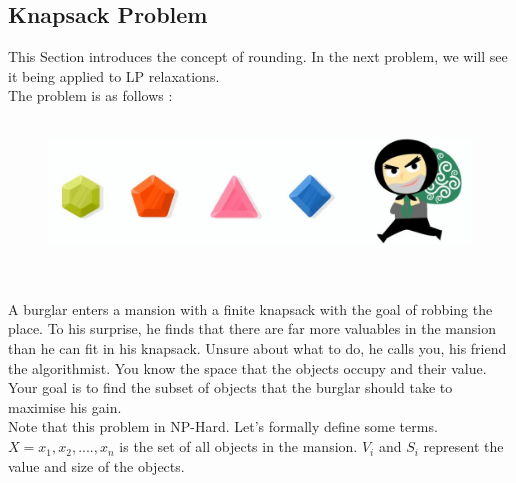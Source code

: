 \documentclass[12pt]{report}
\begin{document}
\subsection*{Knapsack Problem}
This Section introduces the concept of rounding. In the next problem, we will see it being applied to LP relaxations. \\
The problem is as follows :
\begin{figure}[h]
\includegraphics[width=12cm, height=3.75cm]{knap.jpg}
\centering
\end{figure}\\
A burglar enters a mansion with a finite knapsack with the goal of robbing the place. To his surprise, he finds that there are far more valuables in the mansion than he can fit in his knapsack. Unsure about what to do, he calls you, his friend the algorithmist. You know the space that the objects occupy and their value. Your goal is to find the subset of objects that the burglar should take to maximise his gain. \\
Note that this problem in NP-Hard.
Let's formally define some terms. $X = {x_1, x_2, ...., x_n}$ is the set of all objects in the mansion. $V_i$ and $S_i$ represent the value and size of the objects.\\
\end{document}
